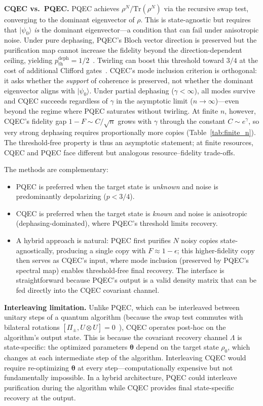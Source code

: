 \documentclass[prx,twocolumn,superscriptaddress,longbibliography,floatfix]{revtex4-2}
\begin{document}
\textbf{CQEC vs.\ PQEC.}
PQEC achieves $\rho^N / \mathrm{Tr}(\rho^N)$ via the recursive swap test, converging to the dominant eigenvector of $\rho$.
This is state-agnostic but requires that $|\psi_0\rangle$ \emph{is} the dominant eigenvector---a condition that can fail under anisotropic noise.
Under pure dephasing, PQEC's Bloch vector direction is preserved but the purification map cannot increase the fidelity beyond the direction-dependent ceiling, yielding $p_\mathrm{th}^\mathrm{deph} = 1/2$~\cite{Raghoonanan2026}.
Twirling can boost this threshold toward $3/4$ at the cost of additional Clifford gates~\cite{Raghoonanan2026}.
CQEC's mode inclusion criterion is orthogonal: it asks whether the \emph{support} of coherence is preserved, not whether the dominant eigenvector aligns with $|\psi_0\rangle$.
Under partial dephasing ($\gamma < \infty$), all modes survive and CQEC succeeds regardless of $\gamma$ in the asymptotic limit ($n \to \infty$)---even beyond the regime where PQEC saturates without twirling.
At finite $n$, however, CQEC's fidelity gap $1 - F \sim C/\sqrt{n}$ grows with $\gamma$ through the constant $C \sim e^\gamma$, so very strong dephasing requires proportionally more copies (Table~\ref{tab:finite_n}).
The threshold-free property is thus an asymptotic statement; at finite resources, CQEC and PQEC face different but analogous resource--fidelity trade-offs.

The methods are complementary:
\begin{itemize}
\item PQEC is preferred when the target state is \emph{unknown} and noise is predominantly depolarizing ($p < 3/4$).
\item CQEC is preferred when the target state is \emph{known} and noise is anisotropic (dephasing-dominated), where PQEC's threshold limits recovery.
\item A hybrid approach is natural: PQEC first purifies $N$ noisy copies state-agnostically, producing a single copy with $F \approx 1 - \epsilon$; this higher-fidelity copy then serves as CQEC's input, where mode inclusion (preserved by PQEC's spectral map) enables threshold-free final recovery.
The interface is straightforward because PQEC's output is a valid density matrix that can be fed directly into the CQEC covariant channel.
\end{itemize}

\textbf{Interleaving limitation.}
Unlike PQEC, which can be interleaved between unitary steps of a quantum algorithm (because the swap test commutes with bilateral rotations $[\Pi_\pm, U \otimes U] = 0$~\cite{Raghoonanan2026}), CQEC operates post-hoc on the algorithm's output state.
This is because the covariant recovery channel $\Lambda$ is state-specific: the optimized parameters $\boldsymbol{\theta}$ depend on the target state $\rho_0$, which changes at each intermediate step of the algorithm.
Interleaving CQEC would require re-optimizing $\boldsymbol{\theta}$ at every step---computationally expensive but not fundamentally impossible.
In a hybrid architecture, PQEC could interleave purification during the algorithm while CQEC provides final state-specific recovery at the output.
\end{document}
